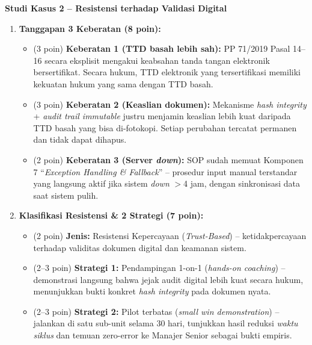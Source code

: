 \documentclass[12pt,a4paper]{report}
\begin{document}
\vspace{0.4cm}

\textbf{Studi Kasus 2 -- Resistensi terhadap Validasi Digital}

\begin{enumerate}[leftmargin=*, label=\textbf{D2.\alph*}]

\item \textbf{Tanggapan 3 Keberatan (8 poin):}
\begin{itemize}[nosep]
    \item (3 poin) \textbf{Keberatan 1 (TTD basah lebih sah):} PP 71/2019 Pasal 14--16 secara eksplisit mengakui keabsahan tanda tangan elektronik bersertifikat. Secara hukum, TTD elektronik yang tersertifikasi memiliki kekuatan hukum yang sama dengan TTD basah.
    \item (3 poin) \textbf{Keberatan 2 (Keaslian dokumen):} Mekanisme \textit{hash integrity} + \textit{audit trail immutable} justru menjamin keaslian lebih kuat daripada TTD basah yang bisa di-fotokopi. Setiap perubahan tercatat permanen dan tidak dapat dihapus.
    \item (2 poin) \textbf{Keberatan 3 (Server \textit{down}):} SOP sudah memuat Komponen 7 ``\textit{Exception Handling \& Fallback}'' -- prosedur input manual terstandar yang langsung aktif jika sistem \textit{down} $>$4 jam, dengan sinkronisasi data saat sistem pulih.
\end{itemize}

\item \textbf{Klasifikasi Resistensi \& 2 Strategi (7 poin):}
\begin{itemize}[nosep]
    \item (2 poin) \textbf{Jenis:} Resistensi Kepercayaan (\textit{Trust-Based}) -- ketidakpercayaan terhadap validitas dokumen digital dan keamanan sistem.
    \item (2--3 poin) \textbf{Strategi 1:} Pendampingan 1-on-1 (\textit{hands-on coaching}) -- demonstrasi langsung bahwa jejak audit digital lebih kuat secara hukum, menunjukkan bukti konkret \textit{hash integrity} pada dokumen nyata.
    \item (2--3 poin) \textbf{Strategi 2:} Pilot terbatas (\textit{small win demonstration}) -- jalankan di satu sub-unit selama 30 hari, tunjukkan hasil reduksi \textit{waktu siklus} dan temuan zero-error ke Manajer Senior sebagai bukti empiris.
\end{itemize}

\end{enumerate}
\end{document}
